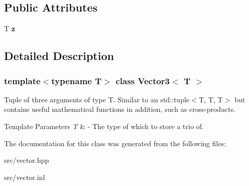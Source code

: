 \subsection*{Public Attributes}
\begin{DoxyCompactItemize}
\item 
\mbox{\label{class_vector3_ab3e7f5401dd6e951978bfa746809f74f}} 
T {\bfseries z}
\end{DoxyCompactItemize}


\subsection{Detailed Description}
\subsubsection*{template$<$typename T$>$\newline
class Vector3$<$ T $>$}

Tuple of three arguments of type T. Similar to an std\+::tuple$<$\+T, T, T$>$ but contains useful mathematical functions in addition, such as cross-\/products. 
\begin{DoxyTemplParams}{Template Parameters}
{\em T} & -\/ The type of which to store a trio of. \\
\hline
\end{DoxyTemplParams}


The documentation for this class was generated from the following files\+:\begin{DoxyCompactItemize}
\item 
src/vector.\+hpp\item 
src/vector.\+inl\end{DoxyCompactItemize}
